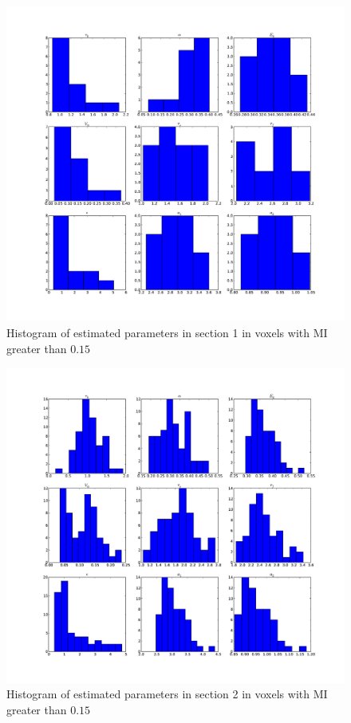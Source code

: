 \begin{figure} %
\centering
\includegraphics[clip=true,trim=2.5cm 2cm 2cm 1cm,width=\textwidth]{images/slicesim_hist1}
\caption{Histogram of estimated parameters in section 1 in voxels 
with \acs{MI} greater than $0.15$} \label{fig:slicesim_hist1}
\end{figure}

\begin{figure} %
\centering
\includegraphics[clip=true,trim=2.5cm 2cm 2cm 1cm,width=\textwidth]{images/slicesim_hist2}
\caption
{Histogram of estimated parameters in section 2 in voxels with \acs{MI} greater
than $0.15$}
\label{fig:slicesim_hist2}
\end{figure}

